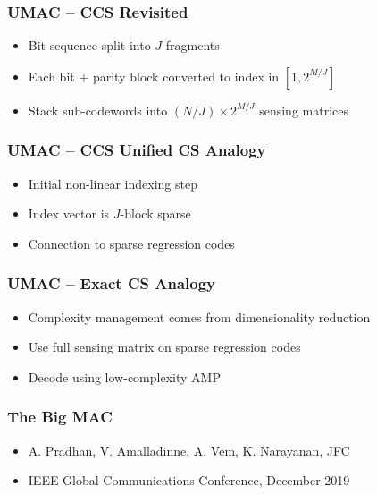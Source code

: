 \documentclass[10pt]{beamer}
\begin{document}
\begin{frame}
\frametitle{UMAC -- CCS Revisited}
\begin{center}

\end{center}
\begin{itemize}
\item Bit sequence split into $J$ fragments
\item Each bit $+$ parity block converted to index in $[ 1, 2^{M/J} ]$
\item Stack sub-codewords into $(N/J) \times 2^{M/J}$ sensing matrices
\end{itemize}
\end{frame}

\begin{frame}
\frametitle{UMAC -- CCS Unified CS Analogy}
\centerline{}
\begin{itemize}
\item Initial non-linear indexing step
\item Index vector is $J$-block sparse
\item Connection to sparse regression codes
\end{itemize}
\end{frame}


\begin{frame}
\frametitle{UMAC -- Exact CS Analogy}
\centerline{}
\begin{itemize}
\item Complexity management comes from dimensionality reduction
\item Use full sensing matrix on sparse regression codes
\item Decode using low-complexity AMP
\end{itemize}
\end{frame}


\begin{frame}
\frametitle{The Big MAC}
\begin{center}
\end{center}
  \begin{itemize}
  \item A. Pradhan, V. Amalladinne, A. Vem, K. Narayanan, JFC
  \item IEEE Global Communications Conference, December 2019
  \end{itemize}
\end{frame}
\end{document}
